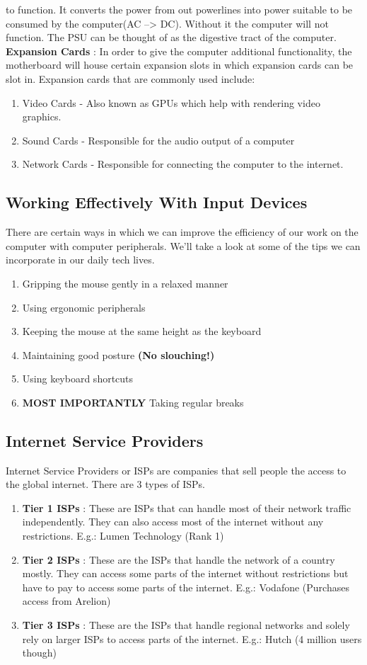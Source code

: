 \documentclass[11pt]{article}
\begin{document}
to function. It converts the power from out powerlines into power suitable to be consumed by the
computer(AC --> DC). Without it the computer will not function. The PSU can be thought of as the
digestive tract of the computer.
\textbf{Expansion Cards} : In order to give the computer additional functionality, the motherboard will
house certain expansion slots in which expansion cards can be slot in. Expansion cards that are
commonly used include:
\begin{enumerate}
\item Video Cards - Also known as GPUs which help with rendering video graphics.
\item Sound Cards - Responsible for the audio output of a computer
\item Network Cards - Responsible for connecting the computer to the internet.
\end{enumerate}
\subsection{Working Effectively With Input Devices}
\label{sec:org911980e}
There are certain ways in which we can improve the efficiency of our work on the computer with
computer peripherals. We'll take a look at some of the tips we can incorporate in our daily tech
lives.
\begin{enumerate}
\item Gripping the mouse gently in a relaxed manner
\item Using ergonomic peripherals
\item Keeping the mouse at the same height as the keyboard
\item Maintaining good posture \textbf{(No slouching!)}
\item Using keyboard shortcuts
\item \textbf{MOST IMPORTANTLY} Taking regular breaks
\end{enumerate}
\subsection{Internet Service Providers}
\label{sec:org0b4d08b}
Internet Service Providers or ISPs are companies that sell people the access to the global
internet. There are 3 types of ISPs.
\begin{enumerate}
\item \textbf{Tier 1 ISPs} : These are ISPs that can handle most of their network traffic independently. They
can also access most of the internet without any restrictions.
E.g.: Lumen Technology (Rank 1)
\item \textbf{Tier 2 ISPs} : These are the ISPs that handle the network of a country mostly. They can access
some parts of the internet without restrictions but have to pay to access some parts of the
internet.
E.g.: Vodafone (Purchases access from Arelion)
\item \textbf{Tier 3 ISPs} : These are the ISPs that handle regional networks and solely rely on larger ISPs
to access parts of the internet.
E.g.: Hutch (4 million users though)
\end{enumerate}
\end{document}
